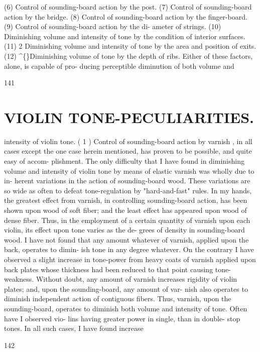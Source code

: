 \documentclass{article}
\begin{document}
(6) Control of sounding-board action by the post. (7) Control of sounding-board action by the bridge. (8) Control of sounding-board action by the finger-board. (9) Control of sounding-board action by the di- ameter of strings. (10) Diminishing volume and intensity of tone by the condition of interior surfaces. (11) 2 Diminishing volume and intensity of tone by the area and position of exits. (12) \textasciicircum\{\}Diminishing volume of tone by the depth of ribs. Either of these factors, alone, is capable of pro- ducing perceptible diminution of both volume and

141

\section*{VIOLIN TONE-PECULIARITIES.}
intensity of violin tone. ( 1 ) Control of sounding-board action by varnish , in all cases except the one case herein mentioned, has proven to be possible, and quite easy of accom- plishment. The only difficulty that I have found in diminishing volume and intensity of violin tone by means of elastic varnish was wholly due to in- herent variations in the action of sounding-board wood. These variations are so wide as often to defeat tone-regulation by "hard-and-fast" rules. In my hands, the greatest effect from varnish, in controlling sounding-board action, has been shown upon wood of soft fiber; and the least effect has appeared upon wood of dense fiber. Thus, in the employment of a certain quantity of varnish upon each violin, its effect upon tone varies as the de- grees of density in sounding-board wood. I have not found that any amount whatever of varnish, applied upon the back, operates to dimin- ish tone in any degree whatever. On the contrary I have observed a slight increase in tone-power from heavy coats of varnish applied upon back plates whose thickness had been reduced to that point causing tone-weakness. Without doubt, any amount of varnish increases rigidity of violin plates; and, upon the sounding-board, any amount of var- nish also operates to diminish independent action of contiguous fibers. Thus, varnish, upon the sounding-board, operates to diminish both volume and intensity of tone. Often have I observed vio- lins having greater power in single, than in double- stop tones. In all such cases, I have found increase

142
\end{document}
